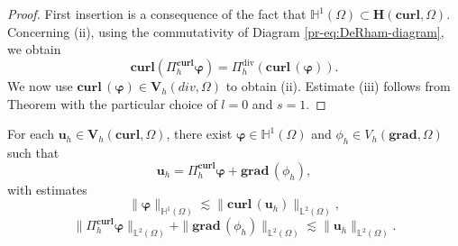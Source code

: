 \begin{proof}
First insertion is a consequence of the fact that $\mathbb{H}^1(\Omega) \subset \mathbf{H}(\textbf{curl},\Omega)$. Concerning (ii), using the commutativity of Diagram \eqref{pr-eq:DeRham-diagram}, we obtain
$$
\textbf{curl}\left( \Pi_h^{\textbf{curl}} \bm{\varphi}\right)= \Pi_h^{\text{div}} \left( \textbf{curl}\, (\bm{\varphi}) \right).
$$
We now use $\textbf{curl}\,(\bm{\varphi}) \in \bm{V}_h(div,\Omega)$ to obtain (ii). Estimate (iii) follows from Theorem \cite[Theorem 5.3]{buffa2011isogeometric} with the particular choice of $l=0$ and $s=1$. 
\end{proof}

\begin{lemma}\label{lem-semi-discrete-decomposition}
For each $\bm{u}_h \in \bm{V}_h(\textbf{curl},\Omega)$, there exist $\bm{\varphi} \in \mathbb{H}^1(\Omega)$ and $\phi_h \in V_h(\textbf{grad},\Omega)$ such that
\begin{equation}\label{eq:semi-discrete-decomposition}
\bm{u}_h = \Pi_h^{\textbf{curl}} \bm{\varphi} + \textbf{grad}\,(\phi_h),
\end{equation}
with estimates
\begin{equation}\label{eq:discrete-H-curl-estimate}
\|\bm{\varphi}\|_{\mathbb{H}^1(\Omega)} \lesssim \|\textbf{curl} \,(\bm{u}_h)\|_{\mathbb{L}^2(\Omega)},
\end{equation}
\begin{equation}\label{eq:stability-of-semi-discrete-decomposition}
\|\Pi_h^{\textbf{curl}} \bm{\varphi}\|_{\mathbb{L}^2(\Omega)} + \|\textbf{grad}\,(\phi_h)\|_{\mathbb{L}^2(\Omega)}\lesssim \|\bm{u}_h\|_{\mathbb{L}^2(\Omega)}.
\end{equation}
\end{lemma}

